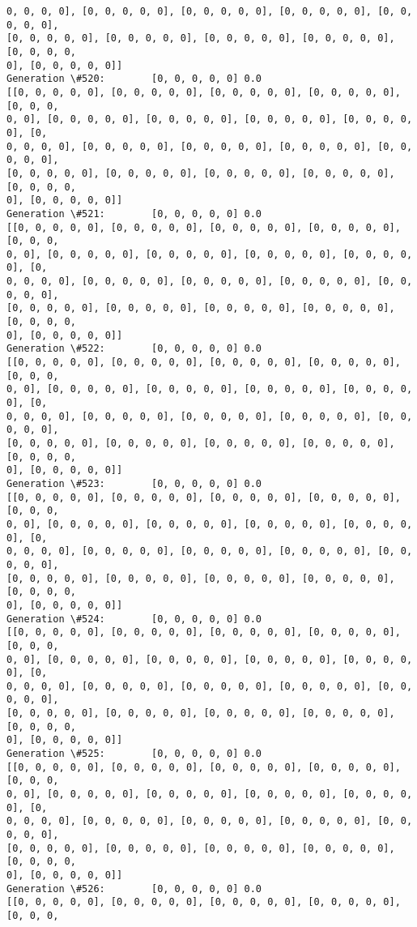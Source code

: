 \documentclass[11pt]{article}
\begin{document}
\begin{Verbatim}[commandchars=\\\{\}]
0, 0, 0, 0], [0, 0, 0, 0, 0], [0, 0, 0, 0, 0], [0, 0, 0, 0, 0], [0, 0, 0, 0, 0],
[0, 0, 0, 0, 0], [0, 0, 0, 0, 0], [0, 0, 0, 0, 0], [0, 0, 0, 0, 0], [0, 0, 0, 0,
0], [0, 0, 0, 0, 0]]
Generation \#520:        [0, 0, 0, 0, 0] 0.0
[[0, 0, 0, 0, 0], [0, 0, 0, 0, 0], [0, 0, 0, 0, 0], [0, 0, 0, 0, 0], [0, 0, 0,
0, 0], [0, 0, 0, 0, 0], [0, 0, 0, 0, 0], [0, 0, 0, 0, 0], [0, 0, 0, 0, 0], [0,
0, 0, 0, 0], [0, 0, 0, 0, 0], [0, 0, 0, 0, 0], [0, 0, 0, 0, 0], [0, 0, 0, 0, 0],
[0, 0, 0, 0, 0], [0, 0, 0, 0, 0], [0, 0, 0, 0, 0], [0, 0, 0, 0, 0], [0, 0, 0, 0,
0], [0, 0, 0, 0, 0]]
Generation \#521:        [0, 0, 0, 0, 0] 0.0
[[0, 0, 0, 0, 0], [0, 0, 0, 0, 0], [0, 0, 0, 0, 0], [0, 0, 0, 0, 0], [0, 0, 0,
0, 0], [0, 0, 0, 0, 0], [0, 0, 0, 0, 0], [0, 0, 0, 0, 0], [0, 0, 0, 0, 0], [0,
0, 0, 0, 0], [0, 0, 0, 0, 0], [0, 0, 0, 0, 0], [0, 0, 0, 0, 0], [0, 0, 0, 0, 0],
[0, 0, 0, 0, 0], [0, 0, 0, 0, 0], [0, 0, 0, 0, 0], [0, 0, 0, 0, 0], [0, 0, 0, 0,
0], [0, 0, 0, 0, 0]]
Generation \#522:        [0, 0, 0, 0, 0] 0.0
[[0, 0, 0, 0, 0], [0, 0, 0, 0, 0], [0, 0, 0, 0, 0], [0, 0, 0, 0, 0], [0, 0, 0,
0, 0], [0, 0, 0, 0, 0], [0, 0, 0, 0, 0], [0, 0, 0, 0, 0], [0, 0, 0, 0, 0], [0,
0, 0, 0, 0], [0, 0, 0, 0, 0], [0, 0, 0, 0, 0], [0, 0, 0, 0, 0], [0, 0, 0, 0, 0],
[0, 0, 0, 0, 0], [0, 0, 0, 0, 0], [0, 0, 0, 0, 0], [0, 0, 0, 0, 0], [0, 0, 0, 0,
0], [0, 0, 0, 0, 0]]
Generation \#523:        [0, 0, 0, 0, 0] 0.0
[[0, 0, 0, 0, 0], [0, 0, 0, 0, 0], [0, 0, 0, 0, 0], [0, 0, 0, 0, 0], [0, 0, 0,
0, 0], [0, 0, 0, 0, 0], [0, 0, 0, 0, 0], [0, 0, 0, 0, 0], [0, 0, 0, 0, 0], [0,
0, 0, 0, 0], [0, 0, 0, 0, 0], [0, 0, 0, 0, 0], [0, 0, 0, 0, 0], [0, 0, 0, 0, 0],
[0, 0, 0, 0, 0], [0, 0, 0, 0, 0], [0, 0, 0, 0, 0], [0, 0, 0, 0, 0], [0, 0, 0, 0,
0], [0, 0, 0, 0, 0]]
Generation \#524:        [0, 0, 0, 0, 0] 0.0
[[0, 0, 0, 0, 0], [0, 0, 0, 0, 0], [0, 0, 0, 0, 0], [0, 0, 0, 0, 0], [0, 0, 0,
0, 0], [0, 0, 0, 0, 0], [0, 0, 0, 0, 0], [0, 0, 0, 0, 0], [0, 0, 0, 0, 0], [0,
0, 0, 0, 0], [0, 0, 0, 0, 0], [0, 0, 0, 0, 0], [0, 0, 0, 0, 0], [0, 0, 0, 0, 0],
[0, 0, 0, 0, 0], [0, 0, 0, 0, 0], [0, 0, 0, 0, 0], [0, 0, 0, 0, 0], [0, 0, 0, 0,
0], [0, 0, 0, 0, 0]]
Generation \#525:        [0, 0, 0, 0, 0] 0.0
[[0, 0, 0, 0, 0], [0, 0, 0, 0, 0], [0, 0, 0, 0, 0], [0, 0, 0, 0, 0], [0, 0, 0,
0, 0], [0, 0, 0, 0, 0], [0, 0, 0, 0, 0], [0, 0, 0, 0, 0], [0, 0, 0, 0, 0], [0,
0, 0, 0, 0], [0, 0, 0, 0, 0], [0, 0, 0, 0, 0], [0, 0, 0, 0, 0], [0, 0, 0, 0, 0],
[0, 0, 0, 0, 0], [0, 0, 0, 0, 0], [0, 0, 0, 0, 0], [0, 0, 0, 0, 0], [0, 0, 0, 0,
0], [0, 0, 0, 0, 0]]
Generation \#526:        [0, 0, 0, 0, 0] 0.0
[[0, 0, 0, 0, 0], [0, 0, 0, 0, 0], [0, 0, 0, 0, 0], [0, 0, 0, 0, 0], [0, 0, 0,

\end{Verbatim}
\end{document}
